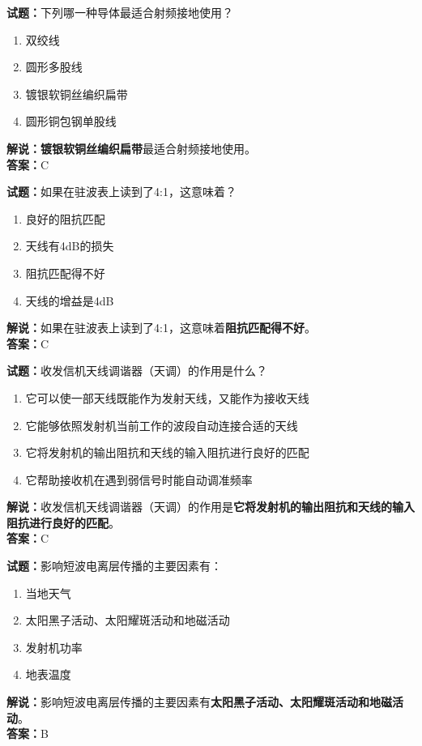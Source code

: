 \documentclass{ctexbook}
\begin{document}

\vspace{1em}

\textbf{试题：}下列哪一种导体最适合射频接地使用？
\begin{enumerate}[leftmargin=3em]
  \item 双绞线
  \item 圆形多股线
  \item 镀银软铜丝编织扁带
  \item 圆形铜包钢单股线
\end{enumerate}
\noindent\textbf{解说：}\textbf{镀银软铜丝编织扁带}最适合射频接地使用。\\\noindent\textbf{答案：}C

\vspace{1em}

\textbf{试题：}如果在驻波表上读到了4:1，这意味着？
\begin{enumerate}[leftmargin=3em]
  \item 良好的阻抗匹配
  \item 天线有4dB的损失
  \item 阻抗匹配得不好
  \item 天线的增益是4dB
\end{enumerate}
\noindent\textbf{解说：}如果在驻波表上读到了4:1，这意味着\textbf{阻抗匹配得不好}。\\\noindent\textbf{答案：}C

\vspace{1em}

\textbf{试题：}收发信机天线调谐器（天调）的作用是什么？
\begin{enumerate}[leftmargin=3em]
  \item 它可以使一部天线既能作为发射天线，又能作为接收天线
  \item 它能够依照发射机当前工作的波段自动连接合适的天线
  \item 它将发射机的输出阻抗和天线的输入阻抗进行良好的匹配
  \item 它帮助接收机在遇到弱信号时能自动调准频率
\end{enumerate}
\noindent\textbf{解说：}收发信机天线调谐器（天调）的作用是\textbf{它将发射机的输出阻抗和天线的输入阻抗进行良好的匹配}。\\\noindent\textbf{答案：}C

\vspace{1em}

\textbf{试题：}影响短波电离层传播的主要因素有：
\begin{enumerate}[leftmargin=3em]
  \item 当地天气
  \item 太阳黑子活动、太阳耀斑活动和地磁活动
  \item 发射机功率
  \item 地表温度
\end{enumerate}
\noindent\textbf{解说：}影响短波电离层传播的主要因素有\textbf{太阳黑子活动、太阳耀斑活动和地磁活动}。\\\noindent\textbf{答案：}B
\end{document}
